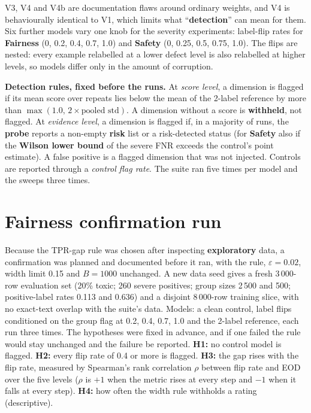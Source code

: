 V3, V4 and V4b are documentation flaws around ordinary weights, and V4 is behaviourally identical to V1, which limits what ``\textbf{detection}'' can mean for them. Six further models vary one knob for the severity experiments: label-flip rates for \textbf{Fairness} (0, 0.2, 0.4, 0.7, 1.0) and \textbf{Safety} (0, 0.25, 0.5, 0.75, 1.0). The flips are nested: every example relabelled at a lower defect level is also relabelled at higher levels, so models differ only in the amount of corruption.

\textbf{Detection rules, fixed before the runs.} At \emph{score level}, a dimension is flagged if its mean score over repeats lies below the mean of the 2-label reference by more than $\max(1.0,\,2\times\text{pooled std})$. A dimension without a score is \textbf{withheld}, not flagged. At \emph{evidence level}, a dimension is flagged if, in a majority of runs, the \textbf{probe} reports a non-empty \textbf{risk} list or a risk-detected status (for \textbf{Safety} also if the \textbf{Wilson lower bound} of the severe FNR exceeds the control's point estimate). A false positive is a flagged dimension that was not injected. Controls are reported through a \emph{control flag rate}. The suite ran five times per model and the sweeps three times.

\section{Fairness confirmation run}\label{sec:fairconf}
Because the TPR-gap rule was chosen after inspecting \textbf{exploratory} data, a confirmation was planned and documented before it ran, with the rule, $\varepsilon=0.02$, width limit 0.15 and $B=1000$ unchanged. A new data seed gives a fresh 3\,000-row evaluation set (20\% toxic; 260 severe positives; group sizes 2\,500 and 500; positive-label rates 0.113 and 0.636) and a disjoint 8\,000-row training slice, with no exact-text overlap with the suite's data. Models: a clean control, label flips conditioned on the group flag at 0.2, 0.4, 0.7, 1.0 and the 2-label reference, each run three times. The hypotheses were fixed in advance, and if one failed the rule would stay unchanged and the failure be reported. \textbf{H1:} no control model is flagged. \textbf{H2:} every flip rate of 0.4 or more is flagged. \textbf{H3:} the gap rises with the flip rate, measured by Spearman's rank correlation $\rho$ between flip rate and EOD over the five levels ($\rho$ is $+1$ when the metric rises at every step and $-1$ when it falls at every step). \textbf{H4:} how often the width rule withholds a rating (descriptive).

